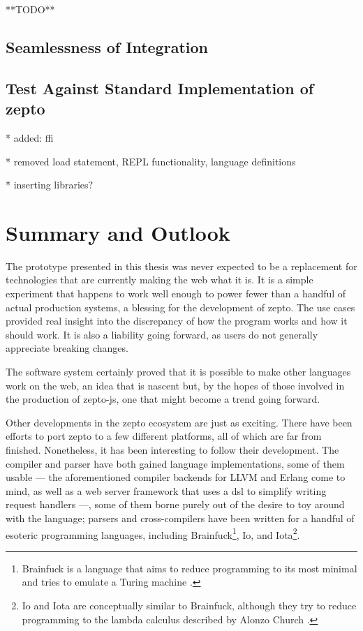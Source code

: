 \documentclass[oneside,11pt,xetex]{scrbook}
\begin{document}
**TODO**

\section{Seamlessness of Integration}

\section{Test Against Standard Implementation of zepto}

* added: ffi

* removed load statement, REPL functionality, language definitions

* inserting libraries?

\chapter{Summary and Outlook}
\label{chap:outlook}

The prototype presented in this thesis was never expected to be a replacement
for technologies that are currently making the web what it is. It is a simple
experiment that happens to work well enough to power fewer than a handful of
actual production systems, a blessing for the development of zepto. The
use cases provided real insight into the discrepancy of how the program
works and how it should work. It is also a liability going forward, as users
do not generally appreciate breaking changes.

The software system certainly proved that it is possible to make other
languages work on the web, an idea that is nascent but, by the hopes of
those involved in the production of zepto-js, one that might become a trend
going forward.

Other developments in the zepto ecosystem are just as exciting. There have
been efforts to port zepto to a few different platforms, all of which are
far from finished. Nonetheless, it has been interesting to follow their development.
The compiler and parser have both gained language implementations, some of
them usable --- the aforementioned compiler backends for LLVM and Erlang come to
mind, as well as a web server framework that uses a \gls{dsl} to simplify writing
request handlers ---, some of them borne purely out of the desire to toy around
with the language; parsers and cross-compilers have been written for a handful of
esoteric programming languages, including Brainfuck\footnote{Brainfuck is a language
that aims to reduce programming to its most minimal and tries to emulate a Turing
machine \parencite{BFK}.}, Io, and Iota\footnote{Io and Iota are conceptually similar
to Brainfuck, although they try to reduce programming to the lambda calculus described
by Alonzo Church \parencite{IOT}.}.
\end{document}
